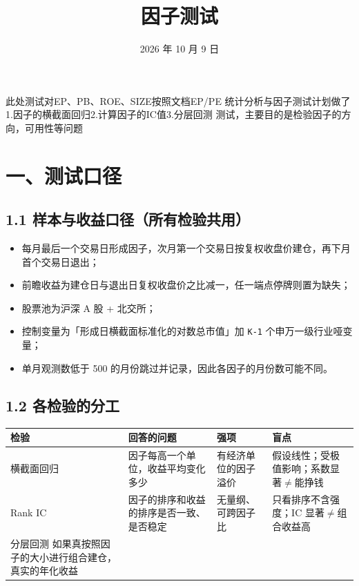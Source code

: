 \documentclass[UTF8,a4paper,11pt]{ctexart}
\title{\textbf{因子测试}}
\author{}
\date{2026 年 10 月 9 日}
\begin{document}
\maketitle
\tableofcontents
\newpage

此处测试对EP、PB、ROE、SIZE按照文档EP/PE 统计分析与因子测试计划做了1.因子的横截面回归2.计算因子的IC值3.分层回测
测试，主要目的是检验因子的方向，可用性等问题

{}
\section*{一、测试口径}

{}
\subsection*{1.1 样本与收益口径（所有检验共用）}

\begin{itemize}[leftmargin=2em,itemsep=2pt,topsep=3pt]
\item 
每月最后一个交易日形成因子，次月第一个交易日按复权收盘价建仓，再下月首个交易日退出；

\item 
前瞻收益为建仓日与退出日复权收盘价之比减一，任一端点停牌则置为缺失；

\item 
股票池为沪深 A 股 + 北交所；

\item 
控制变量为「形成日横截面标准化的对数总市值」加 \texttt{K-1} 个申万一级行业哑变量；

\item 
单月观测数低于 500 的月份跳过并记录，因此各因子的月份数可能不同。

\end{itemize}

{}
\subsection*{1.2 各检验的分工}

\begin{table}[htbp]
\centering
\begin{tabularx}{\textwidth}{@{}YYYY@{}}
\toprule
检验 & 回答的问题 & 强项 & 盲点 \\
\midrule
横截面回归 & 因子每高一个单位，收益平均变化多少 & 有经济单位的因子溢价 & 假设线性；受极值影响；系数显著$\neq$能挣钱 \\
Rank IC & 因子的排序和收益的排序是否一致、是否稳定 & 无量纲、可跨因子比 & 只看排序不含强度；IC 显著$\neq$组合收益高 \\
分层回测                                    如果真按照因子的大小进行组合建仓，真实的年化收益 &  &  &  \\
\bottomrule
\end{tabularx}
\end{table}
\end{document}
